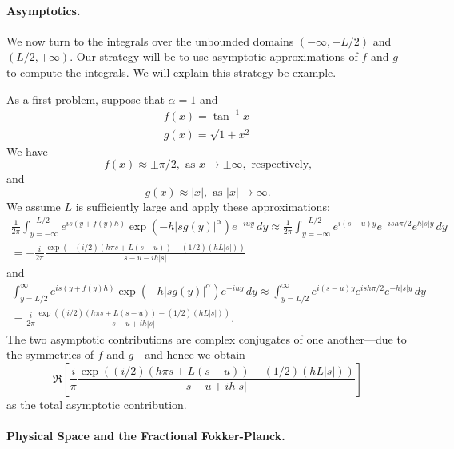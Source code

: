 \documentclass[11pt,letterpaper]{article}
\begin{document}
\paragraph{Asymptotics.} We now turn to the integrals over the unbounded domains $(-\infty, -L/2)$ and $(L/2, +\infty)$. Our strategy will be to use asymptotic approximations of $f$ and $g$ to compute the integrals. We will explain this strategy be example.

As a first problem, suppose that $\alpha = 1$ and
\begin{gather*}
f(x) = \tan^{-1} x \\
g(x) = \sqrt{1 + x^2}
\end{gather*}
We have
\[
f(x) \approx \pm \pi/2, \text{ as } x \to \pm \infty, \text{ respectively,}
\]
and
\[
g(x) \approx |x|, \text{ as } |x| \to \infty.
\]
We assume $L$ is sufficiently large and apply these approximations:
\begin{multline*}
\frac{1}{2 \pi} \int_{y=-\infty}^{-L/2} e^{is\left(y+f(y)h\right)}\exp{\left(  -h |s g(y)|^{\alpha} \right)}e^{-iuy}\, dy \approx \frac{1}{2 \pi} \int_{y=-\infty}^{-L/2} e^{i(s-u)y} e^{-i s h \pi/2} e^{h |s| y} \, dy \\
 = - \frac{i}{2 \pi} \frac{\exp \left( - (i/2)(h \pi s + L(s-u)) - (1/2)(h L |s|) \right)}{s - u - i h |s|}
\end{multline*}
and
\begin{multline*}
\int_{y=L/2}^{\infty} e^{is\left(y+f(y)h\right)}\exp{\left(  -h |s g(y)|^{\alpha} \right)}e^{-iuy}\, dy \approx \int_{y=L/2}^{\infty} e^{i(s-u)y} e^{i s h \pi/2} e^{-h |s| y} \, dy \\
 = \frac{i}{2 \pi} \frac{\exp \left( (i/2)(h \pi s + L(s-u)) - (1/2)(h L |s|) \right)}{s - u + i h |s|}.
\end{multline*}
The two asymptotic contributions are complex conjugates of one another---due to the symmetries of $f$ and $g$---and hence we obtain
\begin{equation}
\label{eqn:asympcalc}
\Re \left[ \frac{i}{\pi} \frac{\exp \left( (i/2)(h \pi s + L(s-u)) - (1/2)(h L |s|) \right)}{s - u + i h |s|} \right]
\end{equation}
as the total asymptotic contribution.

\paragraph{Physical Space and the Fractional Fokker-Planck.}
\end{document}
